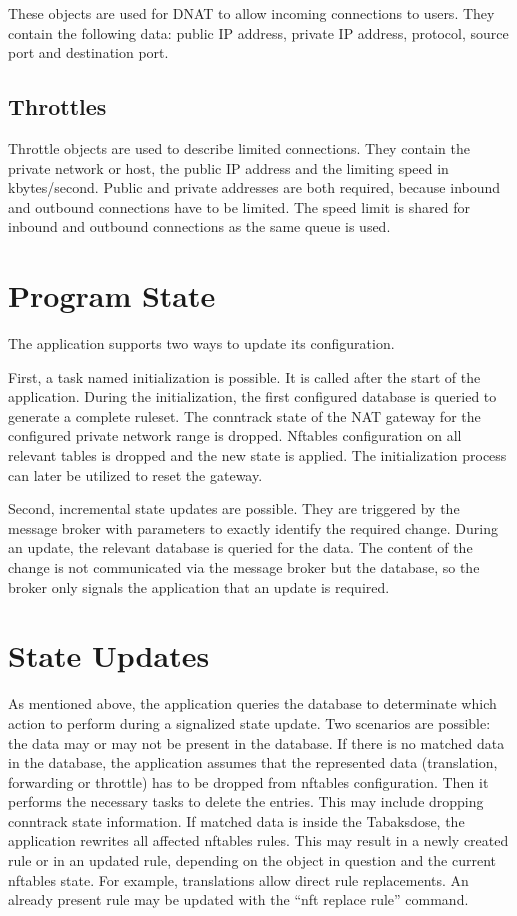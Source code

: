 \documentclass{report}
\begin{document}
These objects are used for DNAT to allow incoming connections to users.
They contain the following data: public IP address, private IP address, protocol, source
port and destination port.

\subsection{Throttles}\label{throttles}

Throttle objects are used to describe limited connections. They contain
the private network or host, the public IP address and the limiting speed in
kbytes/second. Public and private addresses are both required, because
inbound and outbound connections have to be limited. The speed limit is
shared for inbound and outbound connections as the same queue is used.

\section{Program State}\label{program-state}

The application supports two ways to update its configuration.

First, a task named initialization is possible. It is called after
the start of the application. During the initialization, the first
configured database is queried to generate a complete ruleset. The
conntrack state of the NAT gateway for the configured private network range is
dropped. Nftables configuration on all relevant tables is dropped and the
new state is applied. The initialization process can later be utilized
to reset the gateway.

Second, incremental state updates are possible. They are triggered by
the message broker with parameters to exactly identify the required
change. During an update, the relevant database is queried for the data.
The content of the change is not communicated via the message broker but
the database, so the broker only signals the application that an
update is required.

\section{State Updates}\label{state-updates}

As mentioned above, the application queries the database to determinate
which action to perform during a signalized state update. Two
scenarios are possible: the data may or may not be present in the
database.
If there is no matched data in the database, the application
assumes that the represented data (translation, forwarding or throttle)
has to be dropped from nftables configuration. Then it
performs the necessary tasks to delete the entries. This may include
dropping conntrack state information.
If matched data is inside the Tabaksdose, the application rewrites
all affected nftables rules. This may result in a newly created rule or
in an updated rule, depending on the object in question and the current
nftables state. For example, translations allow direct rule replacements.
An already present rule may be updated with the ``nft replace rule'' command.
\end{document}
